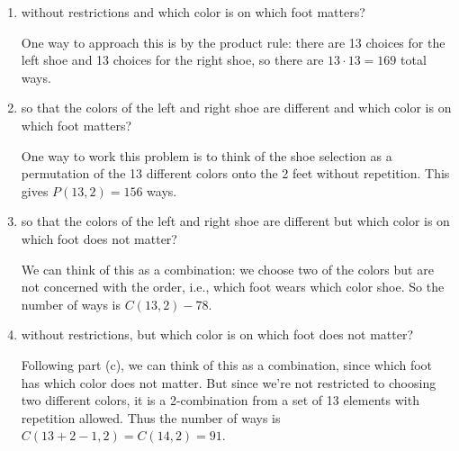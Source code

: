 \documentclass[11pt]{article}
\begin{document}
\begin{enumerate}[label=\textbf{\arabic*.}]
	\begin{enumerate}[label=\textbf{\alph*)}]
		\item without restrictions and which color is on which foot matters?
		
		One way to approach this is by the product rule: there are 13 choices for the left shoe and 13 choices for the right shoe, so there are $13 \cdot 13 = 169$ total ways.
		
		\item so that the colors of the left and right shoe are different and which color is on which foot matters?
		
		One way to work this problem is to think of the shoe selection as a permutation of the 13 different colors onto the 2 feet without repetition. This gives $P(13, 2) = 156$ ways.
		
		\item so that the colors of the left and right shoe are different but which color is on which foot does not matter?
		
		We can think of this as a combination: we choose two of the colors but are not concerned with the order, i.e., which foot wears which color shoe. So the number of ways is $C(13, 2) - 78$.
		
		\item without restrictions, but which color is on which foot does not matter?
		
		Following part (c), we can think of this as a combination, since which foot has which color does not matter. But since we're not restricted to choosing two different colors, it is a 2-combination from a set of 13 elements with repetition allowed. Thus the number of ways is $C(13 + 2 - 1, 2) = C(14, 2) = 91$.
	\end{enumerate}
\end{enumerate}
\end{document}
